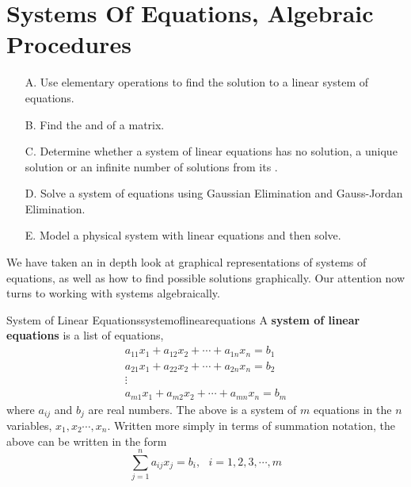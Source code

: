 \section{Systems Of Equations, Algebraic Procedures}

\begin{outcome}
\begin{enumerate}
\item[A.] Use elementary operations to find the solution to a linear system of equations. 

\item[B.] Find the \ef\;and \rref\;of a matrix. 

\item[C.] Determine whether a system of linear equations has no solution, a
unique solution or an infinite number of solutions from its \ef.

\item[D.] Solve a system of equations using Gaussian Elimination and Gauss-Jordan Elimination.

\item[E.] Model a physical system with linear equations and then solve. 
\end{enumerate}

\end{outcome}

We have taken an in depth look at graphical representations of systems of equations, as well as how to find possible
solutions graphically. Our attention now turns to working with systems algebraically. 

\begin{definition}{System of Linear Equations}{systemoflinearequations}
A \textbf{system of linear equations}  is a list of equations,
\begin{equation*}
\begin{array}{c}
a_{11}x_{1}+a_{12}x_{2}+\cdots +a_{1n}x_{n}=b_{1} \\
a_{21}x_{1}+a_{22}x_{2}+\cdots +a_{2n}x_{n}=b_{2} \\
\vdots \\
a_{m1}x_{1}+a_{m2}x_{2}+\cdots +a_{mn}x_{n}=b_{m}
\end{array}
\end{equation*}
where $a_{ij}$ and $b_{j}$ are real numbers. The above is a system
of $m$ equations in the $n$ variables, $x_{1},x_{2}\cdots ,x_{n}$.
 Written more simply in terms
of summation notation, the above can be written in the form
\begin{equation*}
\sum_{j=1}^{n}a_{ij}x_{j}=b_{i},
\text{ }i=1,2,3,\cdots ,m
\end{equation*}
\end{definition}

